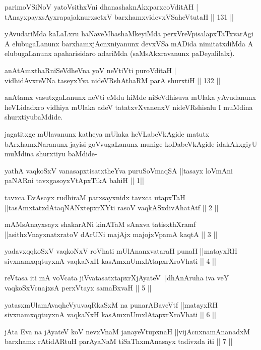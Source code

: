 \begin{shl}
parimoVSiNoV yatoV\s sithxVni dhanashaknAkxparxcoVditAH |\\
tAnayxpayxsAyxrapajaknurxsetxV barxhamxvidevxVSaheVtutaH \hfill || 131 ||
\end{shl}

\begin{artha}
yAvudariMda kaLaLxru haNaveMbashaMkeyiMda perxVreVpisalapxTaTxvarAgi A elubugaLanunx barxhamxjAcnxniyanunx devxVSa mADida nimitatxdiMda A elubugaLanunx apaharisidaro adariMda (saMsAkxravanunx paDeyalilalx).
\end{artha}

\begin{shl}
anAtAmxthaRniSeVdheVna yoV neVtiVti puroVditaH |\\
vidhidAvxreVNa taseyxYva nideVRshAthaRM parA shurxtiH \hfill || 132 ||
\end{shl}

\begin{artha}%
anAtamx vasutxgaLanunx neVti eMdu hiMde niSeVdhisuva mUlaka yAvudanunx heVLidadxro vidhiya mUlaka adeV tatatxvXvanenxV nideVRshisalu I muMdina shurxtiyubaMdide.

jagatitxge mUlavanunx katheya mUlaka heVLabeVkAgide matutx bArxhamxNaranunx jayisi goVvugaLanunx munige koDabeVkAgide idakAkxgiyU muMdina shurxtiyu baMdide-
\end{artha}


\begin{shl}
yathA vaqkoSxV vanasapxtisatxtheYva puruSoV\s maqSA ||tasayx loVmAni paNARni tavxgasoyxVtApxTikA bahiH || 1||

tavxca EvAsayx rudhiraM parxsayxnidx tavxca utapxTaH ||tasAmxtatxdAtaqNANxtepxrXYti rasoV vaqkASxdivAhatAtf || 2 ||

mAMsAnayxsayx shakarANi kinATaM sAnxva tatisxthXramf ||asithxVnayxnatxratoV dArUNi majAjx majojxVpamA kaqtA || 3 ||

yadavxqqkoSxV vaqkoNxV roVhati mUlAnanxvataraH punaH ||matayxRH sivxnamxqqtuyxnA vaqkaNxH kasAmxnUmxlAtapxrXroVhati || 4 ||

reVtasa iti mA voVcata jiVvatasatxtapxrXjAyateV ||dhAnAruha iva veY vaqkoSxV\s cnajxsA perxVtayx samaBxvaH || 5 ||

yatasxmUlamAvaqheVyuvaqRkaSxM na punarABaveVtf ||matayxRH sivxnamxqqtuyxnA vaqkaNxH kasAmxnUmxlAtapxrXroVhati || 6 ||

jAta Eva na jAyateV koV nevxVnaM janayeVtupxnaH ||vijAcnxnamAnanadxM barxhamx rAtidARtuH parAyaNaM tiSaThxmAnasayx tadivxda iti || 7 ||
\end{shl}

